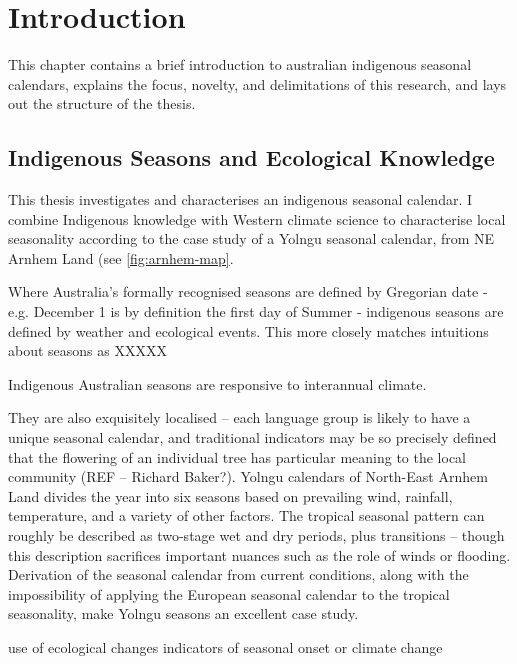 \chapter{Introduction}
This chapter contains a brief introduction to australian indigenous seasonal calendars,
explains the focus, novelty, and delimitations of this research,
and lays out the structure of the thesis.


\section{Indigenous Seasons and Ecological Knowledge}


This thesis investigates and characterises an indigenous seasonal calendar.
I combine Indigenous knowledge with Western climate science to characterise local seasonality
according to the case study of a Yolngu seasonal calendar,
from NE Arnhem Land (see \autoref{fig:arnhem-map}.


Where Australia's formally recognised seasons are defined by Gregorian date -
e.g. December 1 is by definition the first day of Summer - indigenous seasons
are defined by weather and ecological events.
%
This more closely matches intuitions about seasons as XXXXX

Indigenous Australian seasons are responsive to interannual climate.

They are also exquisitely localised – each language group is likely to have a unique seasonal calendar, and traditional indicators may be so precisely defined that the flowering of an individual tree has particular meaning to the local community (REF – Richard Baker?).
Yolngu calendars of North-East Arnhem Land divides the year into six seasons based on prevailing wind, rainfall, temperature, and a variety of other factors.
The tropical seasonal pattern can roughly be described as two-stage wet and dry periods, plus transitions – though this description sacrifices important nuances such as the role of winds or flooding.
Derivation of the seasonal calendar from current conditions, along with the impossibility of applying the European seasonal calendar to the tropical seasonality, make Yolngu seasons an excellent case study.




use of ecological changes indicators of seasonal onset or climate change \citep{menzel2006}



